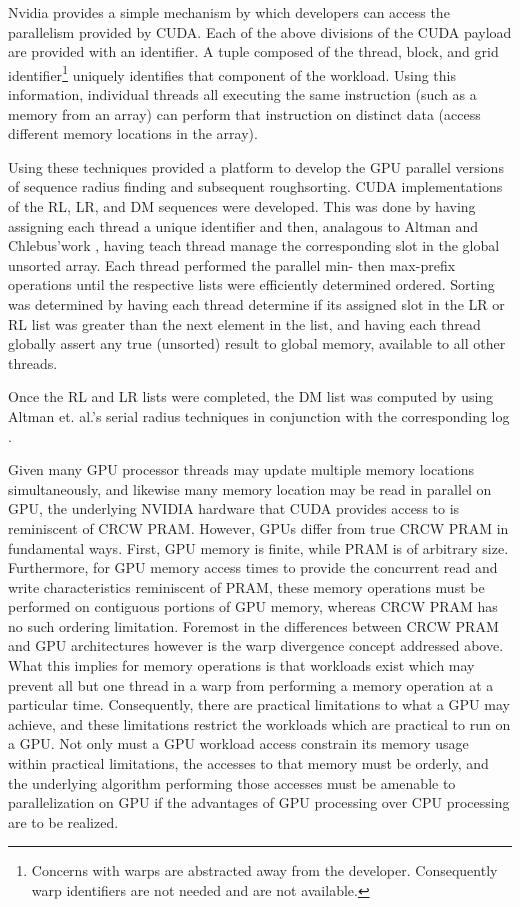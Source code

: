 \documentclass[letterpaper, 12pt]{article}
\begin{document}
Nvidia provides a simple mechanism by which developers can access the parallelism provided by CUDA.  Each of the above divisions of the CUDA payload are provided with an identifier.  A tuple composed of the thread, block, and grid identifier\footnote{Concerns with warps are abstracted away from the developer.  Consequently warp identifiers are not needed and are not available.} uniquely identifies that component of the workload.  Using this information, individual threads all executing the same instruction (such as a memory from an array) can perform that instruction on distinct data (access different memory locations in the array).\cite{nvidiaguide}

Using these techniques provided a platform to develop the GPU parallel versions of sequence radius finding and subsequent roughsorting.  CUDA implementations of the RL, LR, and DM sequences were developed.  This was done by having assigning each thread a unique identifier and then, analagous to Altman and Chlebus\textquoteright work  \cite{altman89}, having teach thread manage the corresponding slot in the global unsorted array.  Each thread performed the parallel min- then max-prefix operations until the respective lists were efficiently determined ordered.  Sorting was determined by having each thread determine if its assigned slot in the LR or RL list was greater than the next element in the list, and having each thread globally assert any true (unsorted) result to global memory, available to all other threads.

Once the RL and LR lists were completed, the DM list was computed by using Altman et. al.\textquoteright s serial radius techniques in conjunction with the corresponding log \cite{altman89}.


Given many GPU processor threads may update multiple memory locations simultaneously, and likewise many memory location may be read in parallel on GPU, the underlying NVIDIA hardware that CUDA provides access to is reminiscent of CRCW PRAM.  However, GPUs differ from true CRCW PRAM in fundamental ways.  First, GPU memory is finite, while PRAM is of arbitrary size.  Furthermore, for GPU memory access times to provide the concurrent read and write characteristics reminiscent of PRAM, these memory operations must be performed on contiguous portions of GPU memory, whereas CRCW PRAM has no such ordering limitation.  Foremost in the differences between CRCW PRAM and GPU architectures however is the warp divergence concept addressed above.  What this implies for memory operations is that workloads exist which may prevent all but one thread in a warp from performing a memory operation at a particular time.  Consequently, there are practical limitations to what a GPU may achieve, and these limitations restrict the workloads which are practical to run on a GPU.  Not only must a GPU workload access constrain its memory usage within practical limitations, the accesses to that memory must be orderly, and the underlying algorithm performing those accesses must be amenable to parallelization on GPU if the advantages of GPU processing over CPU processing are to be realized\cite{dehne2010exploring}.




\nocite{*}
\end{document}
